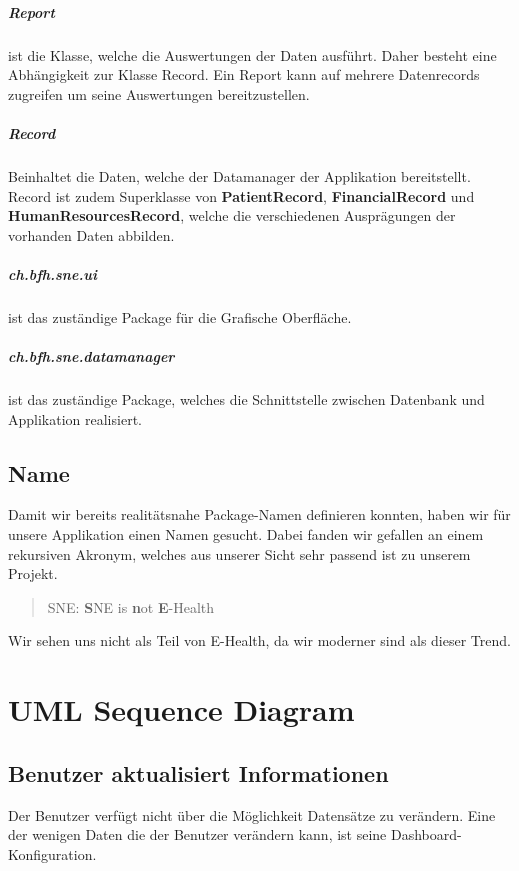 \documentclass[a4paper]{scrreprt}
\begin{document}
\paragraph{Report} ist die Klasse, welche die Auswertungen der Daten ausführt. Daher besteht eine Abhängigkeit zur Klasse Record. Ein Report kann auf mehrere Datenrecords zugreifen um seine Auswertungen bereitzustellen.

\paragraph{Record} Beinhaltet die Daten, welche der Datamanager der Applikation bereitstellt. Record ist zudem Superklasse von \textbf{PatientRecord}, \textbf{FinancialRecord} und \textbf{HumanResourcesRecord}, welche die verschiedenen Ausprägungen der vorhanden Daten abbilden.

\paragraph{ch.bfh.sne.ui} ist das zuständige Package für die Grafische Oberfläche.

\paragraph{ch.bfh.sne.datamanager} ist das zuständige Package, welches die Schnittstelle zwischen Datenbank und Applikation realisiert.


\section{Name}
Damit wir bereits realitätsnahe Package-Namen definieren konnten, haben wir für unsere Applikation einen Namen gesucht. Dabei fanden wir gefallen an einem rekursiven Akronym, welches aus unserer Sicht sehr passend ist zu unserem Projekt.

\begin{quote}
SNE: \textbf{S}NE is \textbf{n}ot \textbf{E}-Health
\end{quote}

Wir sehen uns nicht als Teil von E-Health, da wir moderner sind als dieser Trend.


\chapter{UML Sequence Diagram}

\section{Benutzer aktualisiert Informationen}
Der Benutzer verfügt nicht über die Möglichkeit Datensätze zu verändern. Eine der wenigen Daten die der Benutzer verändern kann, ist seine Dashboard-Konfiguration.
\end{document}
